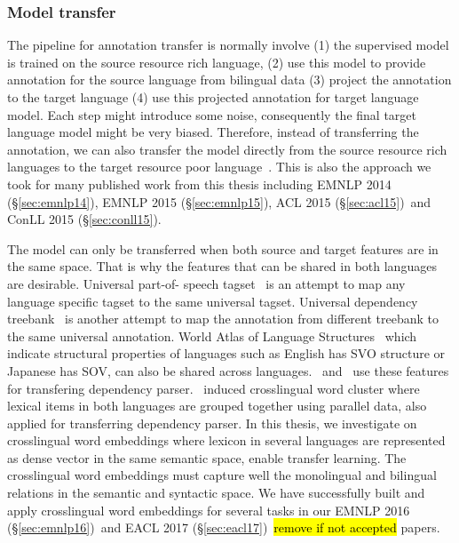 \documentclass[12pt,twoside,final,hidelinks]{ltthesis}
\theoremstyle{definition}
\newcommand\emnlpiv{EMNLP 2014 (\S\ref{sec:emnlp14})}
\newcommand\conllv{ConLL 2015 (\S\ref{sec:conll15})}
\newcommand\aclv{ACL 2015 (\S\ref{sec:acl15})}
\newcommand\emnlpv{EMNLP 2015 (\S\ref{sec:emnlp15})}
\newcommand\emnlpvi{EMNLP 2016 (\S\ref{sec:emnlp16})}
\newcommand\eaclvii{EACL 2017 (\S\ref{sec:eacl17})}
\newcommand{\tofix}[1]{\hl{#1}}
\begin{document}
\subsubsection{Model transfer}
The pipeline for annotation transfer is normally involve (1) the supervised model is trained on the source resource rich language, (2) use this model to provide annotation 
for the source language from bilingual data (3) project the annotation to the target language 
(4) use this projected annotation for target language model. Each step might introduce some 
noise, consequently the final target language model might be very biased. Therefore, instead 
of transferring the annotation, we can also transfer the model directly from the source 
resource rich languages to the target resource poor language~\cite{Zeman08cross-languageparser,P14-1126}. This is also the approach we took for many published work from this thesis including \emnlpiv, \emnlpv, \aclv\ and \conllv.  

The model can only be transferred when both source and target features are in the same space. 
That is why the features that can be shared in both languages are desirable. Universal part-of-
speech tagset~\cite{UniversalTagSet} is an attempt to map any language specific tagset to the 
same universal tagset. Universal dependency treebank~\cite{11234/1-1699} is another attempt to 
map the annotation from different treebank to the same universal annotation. World Atlas of 
Language Structures~\cite{wals} which indicate structural properties of languages such as 
English has SVO structure or Japanese has SOV, can also be shared across 
languages.~ and~ use these 
features for transfering dependency parser.~ induced crosslingual 
word cluster where lexical items in both languages are grouped together using parallel data, also applied for transferring dependency parser. In this thesis, we 
investigate on crosslingual word embeddings where lexicon in several languages are represented 
as dense vector in the same semantic space, enable transfer learning. The crosslingual word 
embeddings must capture well the monolingual and bilingual relations in the semantic and 
syntactic space. We have successfully built and apply crosslingual word embeddings for several 
tasks in our \emnlpvi\ and \eaclvii\ \tofix{remove if not accepted} papers. 
\end{document}
